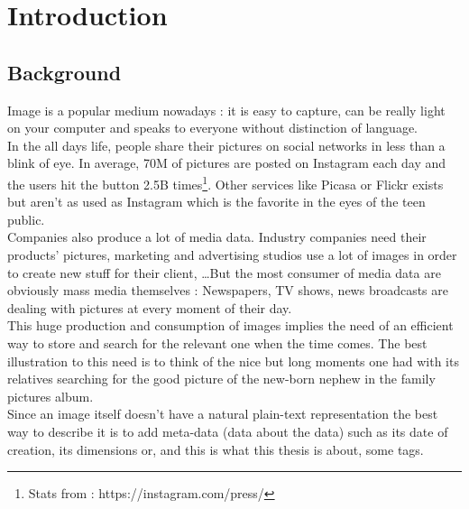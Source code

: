 
\chapter{Introduction} %

\label{Chapter1} %



\section{Background}

Image is a popular medium nowadays : it is easy to capture, can be really light on your computer and speaks to everyone without distinction of language.\\

In the all days life, people share their pictures on social networks in less than a blink of eye. In average, 70M of pictures are posted on Instagram each day and the users hit the  button 2.5B times\footnote{Stats from : https://instagram.com/press/}. Other services like Picasa or Flickr exists but aren't as used as Instagram which is the favorite in the eyes of the teen public.\\
Companies also produce a lot of media data. Industry companies need their products' pictures, marketing and advertising studios use a lot of images in order to create new stuff for their client, \dots But the most consumer of media data are obviously mass media themselves : Newspapers, TV shows, news broadcasts are dealing with pictures at every moment of their day.\\

This huge production and consumption of images implies the need of an efficient way to store and search for the relevant one when the time comes. The best illustration to this need is to think of the nice but long moments one had with its relatives searching for the good picture of the new-born nephew in the family pictures album.\\
Since an image itself doesn't have a natural plain-text representation the best way to describe it is to add meta-data (data about the data) such as its date of creation, its dimensions or, and this is what this thesis is about, some tags.\\

